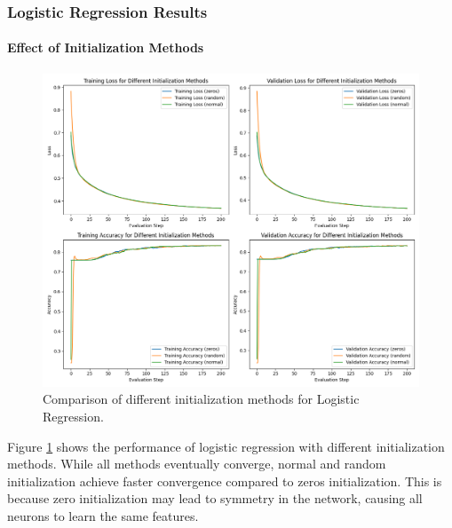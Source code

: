 \documentclass[journal, a4paper]{IEEEtran}
\begin{document}
\subsubsection{Logistic Regression Results}
\paragraph{Effect of Initialization Methods}
\begin{figure}[H]
\centering
\includegraphics[width=\linewidth]{logistic_regression_init_methods.png}
\caption{Comparison of different initialization methods for Logistic Regression.}
\label{fig:lr_init}
\end{figure}

Figure \ref{fig:lr_init} shows the performance of logistic regression with different initialization methods. While all methods eventually converge, normal and random initialization achieve faster convergence compared to zeros initialization. This is because zero initialization may lead to symmetry in the network, causing all neurons to learn the same features.
\end{document}
